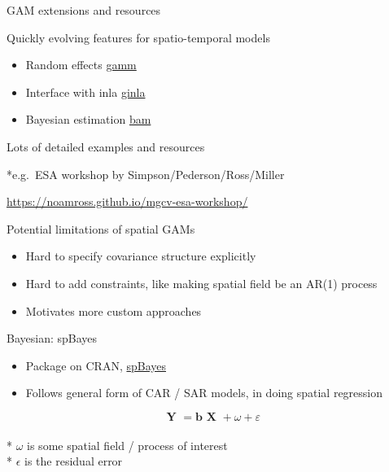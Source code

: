 \documentclass[
  ignorenonframetext,
]{beamer}
\providecommand{\tightlist}{%
  \setlength{\itemsep}{0pt}\setlength{\parskip}{0pt}}
\begin{document}
\begin{frame}{GAM extensions and resources}
\protect\hypertarget{gam-extensions-and-resources}{}

Quickly evolving features for spatio-temporal models

\begin{itemize}
\tightlist
\item
  Random effects
  \href{https://www.rdocumentation.org/packages/mgcv/versions/1.8-34/topics/gamm}{gamm}
\item
  Interface with inla
  \href{https://www.rdocumentation.org/packages/mgcv/versions/1.8-33/topics/ginla}{ginla}
\item
  Bayesian estimation
  \href{https://www.rdocumentation.org/packages/mgcv/versions/1.8-33/topics/bam}{bam}
\end{itemize}

Lots of detailed examples and resources

*e.g.~ESA workshop by Simpson/Pederson/Ross/Miller

\url{https://noamross.github.io/mgcv-esa-workshop/}

\end{frame}

\begin{frame}{Potential limitations of spatial GAMs}
\protect\hypertarget{potential-limitations-of-spatial-gams}{}

\begin{itemize}
\item
  Hard to specify covariance structure explicitly
\item
  Hard to add constraints, like making spatial field be an AR(1) process
\item
  Motivates more custom approaches
\end{itemize}

\end{frame}

\begin{frame}{Bayesian: spBayes}
\protect\hypertarget{bayesian-spbayes}{}

\begin{itemize}
\item
  Package on CRAN,
  \href{https://cran.r-project.org/web/packages/spBayes/index.html}{spBayes}
\item
  Follows general form of CAR / SAR models, in doing spatial regression
\end{itemize}

\[\textbf{ Y }=\textbf{b}\textbf{ X }+{ \omega  }+{ \varepsilon  }\]\\
* \(\omega\) is some spatial field / process of interest\\
* \(\epsilon\) is the residual error

\end{frame}
\end{document}
